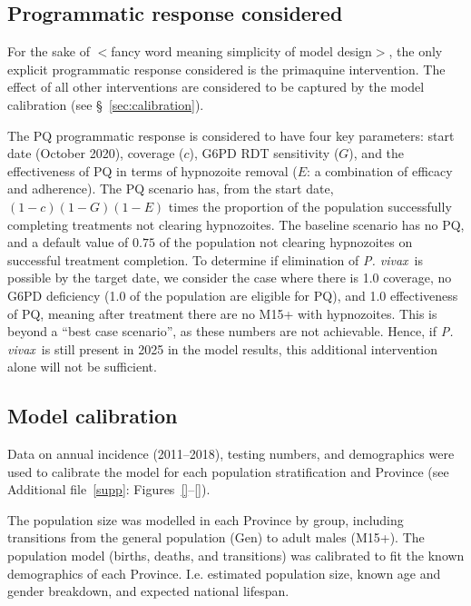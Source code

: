 \documentclass[doublespacing]{bmcart}
\newcommand{\pv}{\textit{P. vivax}}
\begin{document}
\subsection*{Programmatic response considered}
For the sake of $<$fancy word meaning simplicity of model design$>$, the only explicit programmatic response considered is the primaquine intervention. The effect of all other interventions are considered to be captured by the model calibration (see \S~\ref{sec:calibration}).

The PQ programmatic response is considered to have four key parameters: start date (October 2020), coverage ($c$), G6PD RDT sensitivity ($G$), and the effectiveness of PQ in terms of hypnozoite removal ($E$: a combination of efficacy and adherence). The PQ scenario has, from the start date, $(1-c)(1-G)(1-E)$ times the proportion of the population successfully completing treatments not clearing hypnozoites. The baseline scenario has no PQ, and a default value of $0.75$ of the population not clearing hypnozoites on successful treatment completion. To determine if elimination of \pv~is possible by the target date, we consider the case where there is 1.0 coverage, no G6PD deficiency (1.0 of the population are eligible for PQ), and 1.0 effectiveness of PQ, meaning after treatment there are no M15+ with hypnozoites. This is beyond a ``best case scenario'', as these numbers are not achievable. Hence, if \pv~is still present in 2025 in the model results, this additional intervention alone will not be sufficient.  

\subsection*{Model calibration} \label{sec:calibration} %

Data on annual incidence (2011--2018), testing numbers, and demographics were used to calibrate the model for each population stratification and Province (see Additional file~\ref{supp}: Figures~\ref{}--\ref{}). 

The population size was modelled in each Province by group, including transitions from the general population (Gen) to adult males (M15+). The population model (births, deaths, and transitions) was calibrated to fit the known demographics of each Province. I.e. estimated population size, known age and gender breakdown, and expected national lifespan.
\end{document}
